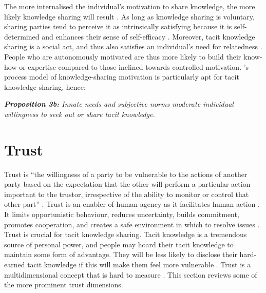 The more internalised the individual's motivation to share knowledge, the more likely knowledge sharing will result \citep{gagne2009model,witherspoon2013antecedents}. As long as knowledge sharing is voluntary, sharing parties tend to perceive it as intrinsically satisfying because it is self-determined and enhances their sense of self-efficacy \citep{lam2010knowledge,dumbach2014establishing}. Moreover, tacit knowledge sharing is a social act, and thus also satisfies an individual's need for relatedness \citep{llopis2016understanding}. People who are autonomously motivated are thus more likely to build their know-how or expertise compared to those inclined towards controlled motivation. \citeauthor{gagne2009model}'s \citeyearpar{gagne2009model} process model of knowledge-sharing motivation is particularly apt for tacit knowledge sharing, hence: \bigskip

\begin{tcolorbox}
\textit{\textbf{Proposition 3b:} Innate needs and subjective norms moderate individual willingness to seek out or share tacit knowledge.}
\end{tcolorbox}

\section{Trust}

Trust is \enquote{the willingness of a party to be vulnerable to the actions of another party based on the expectation that the other will perform a particular action important to the trustor, irrespective of the ability to monitor or control that other part} \citep[][pg. 712]{mayer1995integrative}. Trust is an enabler of human agency as it facilitates human action \citep{muller2008living,mcevily2011measuring}. It limits opportunistic behaviour, reduces uncertainty, builds commitment, promotes cooperation, and creates a safe environment in which to resolve issues \citep{nonaka1994dynamic,panteli2005trust,rasmussen2007work}. Trust is crucial for tacit knowledge sharing. Tacit knowledge is a tremendous source of personal power, and people may hoard their tacit knowledge to maintain some form of advantage. They will be less likely to disclose their hard-earned tacit knowledge if this will make them feel more vulnerable  \citep{levin2004strength,kankanhalli2005contributing,riege2005three,lin2007share,milne2007motivation,alsharo2017virtual}. Trust is a multidimensional concept that is hard to measure \citep{castelfranchi2008trust}. This section reviews some of the more prominent trust dimensions. 

